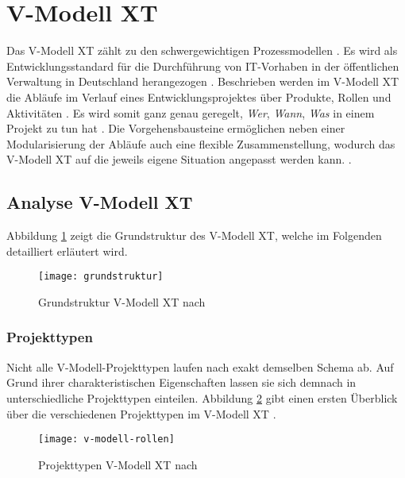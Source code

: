 \section{V-Modell XT}


Das V-Modell XT zählt zu den schwergewichtigen Prozessmodellen \cite{Hanser2010}. Es wird als Entwicklungsstandard für die Durchführung von IT-Vorhaben in der öffentlichen Verwaltung in Deutschland herangezogen \cite{Kuhrmann2011}. Beschrieben werden im V-Modell XT die Abläufe im Verlauf eines Entwicklungsprojektes über Produkte, Rollen und Aktivitäten \cite{Friedrich2008}. Es wird somit ganz genau geregelt, \textit{Wer}, \textit{Wann}, \textit{Was} in einem Projekt zu tun hat \cite{2004vmodell}. Die Vorgehensbausteine ermöglichen neben einer Modularisierung der Abläufe auch eine flexible Zusammenstellung, wodurch das V-Modell XT auf die jeweils eigene Situation angepasst werden kann. \cite{Friedrich2008,Zoerner2012}. \newline
\subsection{Analyse V-Modell XT}

Abbildung \ref{fig:grundstruktur} zeigt die Grundstruktur des V-Modell XT, welche im Folgenden detailliert erläutert wird.
\begin{figure}[htp]
\begin{center}
  \texttt{[image: grundstruktur]} %
  \caption{Grundstruktur V-Modell XT nach \cite{2004vmodell}}
  \label{fig:grundstruktur}
\end{center}
\end{figure}

\subsubsection{Projekttypen}
Nicht alle V-Modell-Projekttypen laufen nach exakt demselben Schema ab. Auf Grund ihrer charakteristischen Eigenschaften lassen sie sich demnach in unterschiedliche Projekttypen einteilen. Abbildung \ref{fig:Projekttypen} gibt einen ersten Überblick über die verschiedenen Projekttypen im V-Modell XT \cite{2004vmodell}.
\begin{figure}[htp]
\begin{center}
  \texttt{[image: v-modell-rollen]} %
  \caption{Projekttypen V-Modell XT nach \cite{2004vmodell}}
  \label{fig:Projekttypen}
\end{center}
\end{figure}

